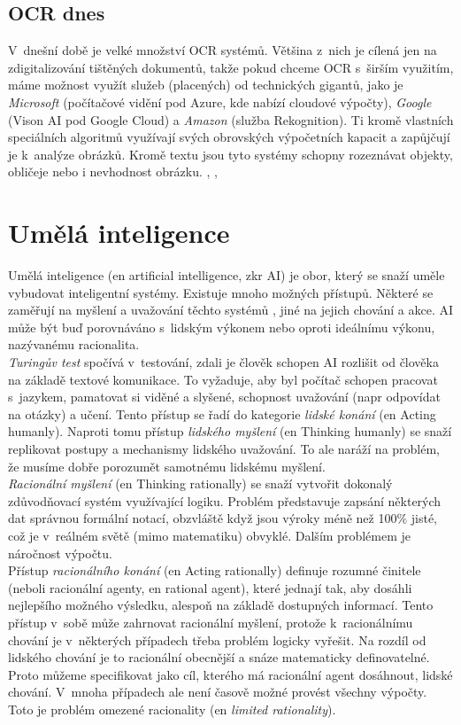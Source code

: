 \documentclass[12pt]{report}			%
\begin{document}
	\section{OCR dnes}
	\label{sec:ocr_today}
	V~dnešní době je velké množství \gls{OCR} systémů. Většina z~nich je cílená jen na zdigitalizování tištěných dokumentů, takže pokud chceme \gls{OCR} s~širším využitím, máme možnost využít služeb (placených) od technických gigantů, jako je \emph{Microsoft} (počítačové vidění pod Azure, kde nabízí cloudové výpočty), \emph{Google} (Vison AI pod Google Cloud) a \emph{Amazon} (služba Rekognition). Ti kromě vlastních speciálních algoritmů využívají svých obrovských výpočetních kapacit a zapůjčují je k~analýze obrázků. Kromě textu jsou tyto systémy schopny rozeznávat objekty, obličeje nebo i nevhodnost obrázku. \parencite{MS_CV}, \parencite{Google_CV}, \parencite{Amazon_CV}
	
	
	
	\chapter{Umělá inteligence}
	\label{sec:AI}
	Umělá inteligence (\gls{en} artificial intelligence, \gls{zkr} \gls{AI}) je obor, který se snaží uměle vybudovat inteligentní systémy. Existuje mnoho možných přístupů. Některé se zaměřují na myšlení a uvažování těchto systémů , jiné na jejich chování a akce. \gls{AI} může být buď porovnáváno s~lidským výkonem nebo oproti ideálnímu výkonu, nazývanému racionalita.\\
	\emph{Turingův test} spočívá v~testování, zdali je člověk schopen \gls{AI} rozlišit od člověka na základě textové komunikace. To vyžaduje, aby byl počítač schopen pracovat s~jazykem, pamatovat si viděné a slyšené, schopnost uvažování (\gls{napr} odpovídat na otázky) a učení. Tento přístup se řadí do kategorie \emph{lidské konání} (\gls{en} Acting humanly). Naproti tomu přístup \emph{lidského myšlení }(\gls{en} Thinking humanly) se snaží replikovat postupy a mechanismy lidského uvažování. To ale naráží na problém, že musíme dobře porozumět samotnému lidskému myšlení.\\
	\emph{Racionální myšlení} (\gls{en} Thinking rationally) se snaží vytvořit dokonalý zdůvodňovací systém využívající logiku. Problém představuje zapsání některých dat správnou formální notací, obzvláště když jsou výroky méně než 100\% jisté, což je v~reálném světě (mimo matematiku) obvyklé. Dalším problémem je náročnost výpočtu.\\
	 Přístup \emph{racionálního konání} (\gls{en} Acting rationally) definuje rozumné činitele (neboli racionální agenty, \gls{en} rational agent), které jednají tak, aby dosáhli nejlepšího možného výsledku, alespoň na základě dostupných informací. Tento přístup v~sobě může zahrnovat racionální myšlení, protože k~racionálnímu chování je v~některých případech třeba problém logicky vyřešit. Na rozdíl od lidského chování je to racionální obecnější a snáze matematicky definovatelné. Proto můžeme specifikovat jako cíl, kterého má racionální agent dosáhnout, lidské chování. V~mnoha případech ale není časově možné provést všechny výpočty. Toto je problém omezené racionality (\gls{en} \emph{limited rationality}).
	\parencite[\gls{s} 1-5,29-30]{AIAMA}
\end{document}
